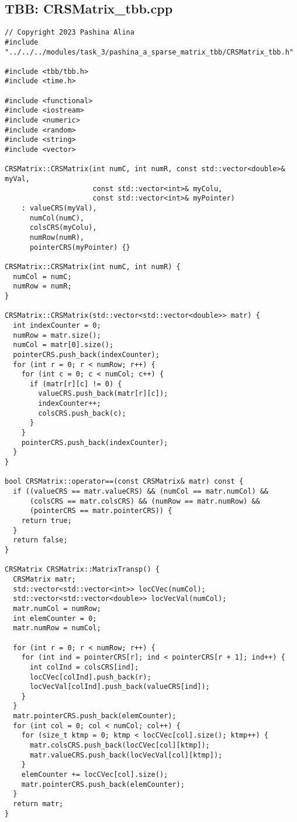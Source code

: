 \documentclass[14pt, russian]{extarticle}
\begin{document}
	\subsection{TBB: CRSMatrix\_tbb.cpp}
	\begin{lstlisting}
// Copyright 2023 Pashina Alina
#include "../../../modules/task_3/pashina_a_sparse_matrix_tbb/CRSMatrix_tbb.h"

#include <tbb/tbb.h>
#include <time.h>

#include <functional>
#include <iostream>
#include <numeric>
#include <random>
#include <string>
#include <vector>

CRSMatrix::CRSMatrix(int numC, int numR, const std::vector<double>& myVal,
                     const std::vector<int>& myColu,
                     const std::vector<int>& myPointer)
    : valueCRS(myVal),
      numCol(numC),
      colsCRS(myColu),
      numRow(numR),
      pointerCRS(myPointer) {}

CRSMatrix::CRSMatrix(int numC, int numR) {
  numCol = numC;
  numRow = numR;
}

CRSMatrix::CRSMatrix(std::vector<std::vector<double>> matr) {
  int indexCounter = 0;
  numRow = matr.size();
  numCol = matr[0].size();
  pointerCRS.push_back(indexCounter);
  for (int r = 0; r < numRow; r++) {
    for (int c = 0; c < numCol; c++) {
      if (matr[r][c] != 0) {
        valueCRS.push_back(matr[r][c]);
        indexCounter++;
        colsCRS.push_back(c);
      }
    }
    pointerCRS.push_back(indexCounter);
  }
}

bool CRSMatrix::operator==(const CRSMatrix& matr) const {
  if ((valueCRS == matr.valueCRS) && (numCol == matr.numCol) &&
      (colsCRS == matr.colsCRS) && (numRow == matr.numRow) &&
      (pointerCRS == matr.pointerCRS)) {
    return true;
  }
  return false;
}

CRSMatrix CRSMatrix::MatrixTransp() {
  CRSMatrix matr;
  std::vector<std::vector<int>> locCVec(numCol);
  std::vector<std::vector<double>> locVecVal(numCol);
  matr.numCol = numRow;
  int elemCounter = 0;
  matr.numRow = numCol;

  for (int r = 0; r < numRow; r++) {
    for (int ind = pointerCRS[r]; ind < pointerCRS[r + 1]; ind++) {
      int colInd = colsCRS[ind];
      locCVec[colInd].push_back(r);
      locVecVal[colInd].push_back(valueCRS[ind]);
    }
  }
  matr.pointerCRS.push_back(elemCounter);
  for (int col = 0; col < numCol; col++) {
    for (size_t ktmp = 0; ktmp < locCVec[col].size(); ktmp++) {
      matr.colsCRS.push_back(locCVec[col][ktmp]);
      matr.valueCRS.push_back(locVecVal[col][ktmp]);
    }
    elemCounter += locCVec[col].size();
    matr.pointerCRS.push_back(elemCounter);
  }
  return matr;
}


\end{lstlisting}
\end{document}
